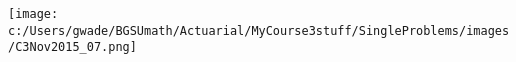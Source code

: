 
\texttt{[image: c:/Users/gwade/BGSUmath/Actuarial/MyCourse3stuff/SingleProblems/images/C3Nov2015\_07.png]}


\showsol{\bsoln

\esoln}
